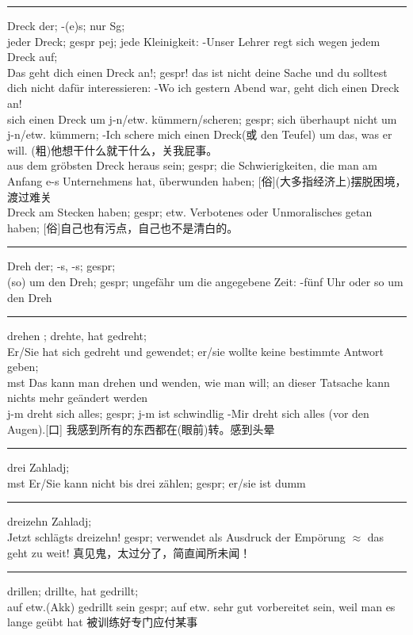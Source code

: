 \noindent\rule{\textwidth}{1pt}
Dreck der; -(e)s; nur Sg; \\
jeder Dreck; gespr pej; jede Kleinigkeit: -Unser Lehrer regt sich wegen jedem Dreck auf; \\
Das geht dich einen Dreck an!; gespr! das ist nicht deine Sache und du solltest dich nicht daf\"ur interessieren: -Wo ich gestern Abend war, geht dich einen Dreck an! \\
sich einen Dreck um j-n/etw. k\"ummern/scheren; gespr; sich \"uberhaupt nicht um j-n/etw. k\"ummern; -Ich schere mich einen Dreck(或 den Teufel) um das, was er will. (粗)他想干什么就干什么，关我屁事。\\
aus dem gr\"obsten Dreck heraus sein; gespr; die Schwierigkeiten, die man am Anfang e-s Unternehmens hat, \"uberwunden haben; [俗](大多指经济上)摆脱困境，渡过难关 \\
Dreck am Stecken haben; gespr; etw. Verbotenes oder Unmoralisches getan haben; [俗]自己也有污点，自己也不是清白的。\\

\noindent\rule{\textwidth}{1pt}
Dreh der; -s, -s; gespr; \\
(so) um den Dreh; gespr; ungef\"ahr um die angegebene Zeit: -f\"unf Uhr oder so um den Dreh \\

\noindent\rule{\textwidth}{1pt}
drehen ; drehte, hat gedreht; \\
Er/Sie hat sich gedreht und gewendet; er/sie wollte keine bestimmte Antwort geben; \\
mst Das kann man drehen und wenden, wie man will; an dieser Tatsache kann nichts mehr ge\"andert werden \\
j-m dreht sich alles; gespr; j-m ist schwindlig -Mir dreht sich alles (vor den Augen).[口] 我感到所有的东西都在(眼前)转。感到头晕 \\

\noindent\rule{\textwidth}{1pt}
drei Zahladj;\\
mst Er/Sie kann nicht bis drei z\"ahlen; gespr; er/sie ist dumm \\

\noindent\rule{\textwidth}{1pt}
dreizehn Zahladj; \\
Jetzt schl\"agts dreizehn! gespr; verwendet als Ausdruck der Emp\"orung $\approx$ das geht zu weit! 真见鬼，太过分了，简直闻所未闻！\\

\noindent\rule{\textwidth}{1pt}
drillen; drillte, hat gedrillt; \\
auf etw.(Akk) gedrillt sein gespr; auf etw. sehr gut vorbereitet sein, weil man es lange ge\"ubt hat 被训练好专门应付某事 \\


